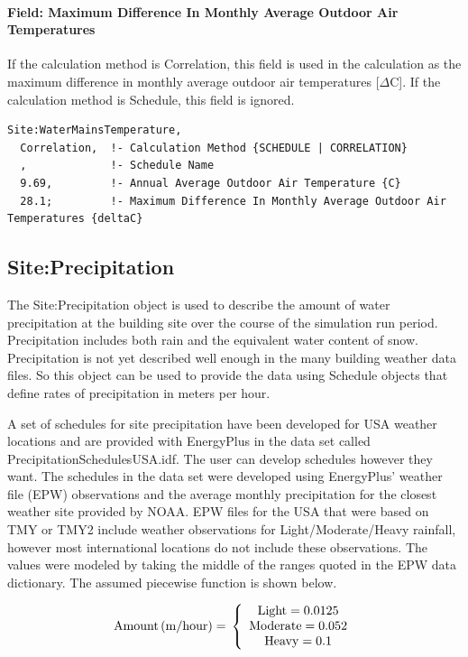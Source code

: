 \paragraph{Field: Maximum Difference In Monthly Average Outdoor Air Temperatures}\label{field-maximum-difference-in-monthly-average-outdoor-air-temperatures}

If the calculation method is Correlation, this field is used in the calculation as the maximum difference in monthly average outdoor air temperatures {[}\(\Delta\)C{]}. If the calculation method is Schedule, this field is ignored.

\begin{lstlisting}
Site:WaterMainsTemperature,
  Correlation,  !- Calculation Method {SCHEDULE | CORRELATION}
  ,             !- Schedule Name
  9.69,         !- Annual Average Outdoor Air Temperature {C}
  28.1;         !- Maximum Difference In Monthly Average Outdoor Air Temperatures {deltaC}
\end{lstlisting}

\subsection{Site:Precipitation}\label{siteprecipitation}

The Site:Precipitation object is used to describe the amount of water precipitation at the building site over the course of the simulation run period. Precipitation includes both rain and the equivalent water content of snow. Precipitation is not yet described well enough in the many building weather data files. So this object can be used to provide the data using Schedule objects that define rates of precipitation in meters per hour.

A set of schedules for site precipitation have been developed for USA weather locations and are provided with EnergyPlus in the data set called PrecipitationSchedulesUSA.idf. The user can develop schedules however they want. The schedules in the data set were developed using EnergyPlus' weather file (EPW) observations and the average monthly precipitation for the closest weather site provided by NOAA. EPW files for the USA that were based on TMY or TMY2 include weather observations for Light/Moderate/Heavy rainfall, however most international locations do not include these observations. The values were modeled by taking the middle of the ranges quoted in the EPW data dictionary. The assumed piecewise function is shown below.

\begin{equation}
\rm{Amount} \, (m/hour) = \, \left\{
  \begin{array}{*{20}{c}}
    \rm{Light} = 0.0125 \\
    \rm{Moderate} = 0.052 \\
    \rm{Heavy} = 0.1
  \end{array}
\right.
\end{equation}


